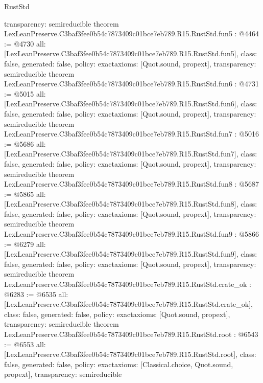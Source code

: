 \begin{lexlean}{RustStd}
\begin{coremodule}
{  transparency: semireducible
}
theorem LexLeanPreserve.C3baf3fee0b54c7873409c01bce7eb789.R15.RustStd.fun5 : @4464 := @4730 {
  all: [LexLeanPreserve.C3baf3fee0b54c7873409c01bce7eb789.R15.RustStd.fun5],
  class: false,
  generated: false,
  policy: exact{axioms: [Quot.sound, propext]},
  transparency: semireducible
}
theorem LexLeanPreserve.C3baf3fee0b54c7873409c01bce7eb789.R15.RustStd.fun6 : @4731 := @5015 {
  all: [LexLeanPreserve.C3baf3fee0b54c7873409c01bce7eb789.R15.RustStd.fun6],
  class: false,
  generated: false,
  policy: exact{axioms: [Quot.sound, propext]},
  transparency: semireducible
}
theorem LexLeanPreserve.C3baf3fee0b54c7873409c01bce7eb789.R15.RustStd.fun7 : @5016 := @5686 {
  all: [LexLeanPreserve.C3baf3fee0b54c7873409c01bce7eb789.R15.RustStd.fun7],
  class: false,
  generated: false,
  policy: exact{axioms: [Quot.sound, propext]},
  transparency: semireducible
}
theorem LexLeanPreserve.C3baf3fee0b54c7873409c01bce7eb789.R15.RustStd.fun8 : @5687 := @5865 {
  all: [LexLeanPreserve.C3baf3fee0b54c7873409c01bce7eb789.R15.RustStd.fun8],
  class: false,
  generated: false,
  policy: exact{axioms: [Quot.sound, propext]},
  transparency: semireducible
}
theorem LexLeanPreserve.C3baf3fee0b54c7873409c01bce7eb789.R15.RustStd.fun9 : @5866 := @6279 {
  all: [LexLeanPreserve.C3baf3fee0b54c7873409c01bce7eb789.R15.RustStd.fun9],
  class: false,
  generated: false,
  policy: exact{axioms: [Quot.sound, propext]},
  transparency: semireducible
}
theorem LexLeanPreserve.C3baf3fee0b54c7873409c01bce7eb789.R15.RustStd.crate_ok : @6283 := @6535 {
  all: [LexLeanPreserve.C3baf3fee0b54c7873409c01bce7eb789.R15.RustStd.crate_ok],
  class: false,
  generated: false,
  policy: exact{axioms: [Quot.sound, propext]},
  transparency: semireducible
}
theorem LexLeanPreserve.C3baf3fee0b54c7873409c01bce7eb789.R15.RustStd.root : @6543 := @6553 {
  all: [LexLeanPreserve.C3baf3fee0b54c7873409c01bce7eb789.R15.RustStd.root],
  class: false,
  generated: false,
  policy: exact{axioms: [Classical.choice, Quot.sound, propext]},
  transparency: semireducible
}


\end{coremodule}
\end{lexlean}
